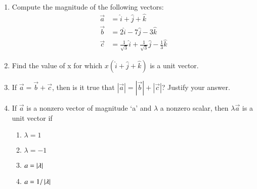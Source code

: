 \begin{enumerate}[label=\thesection.\arabic*,ref=\thesection.\theenumi]
\item Compute the magnitude of the following vectors:
\begin{align}
	\vec{a}&=\hat{i}+\hat{j}+\hat{k}
	\\
	\vec{b}&=2\hat{i}-7\hat{j}-3\hat{k}
	\\
	\vec{c}&=\frac{1}{\sqrt{3}}\hat{i}+\frac{1}{\sqrt{3}}\hat{j}-\frac{1}{3}\hat{k}
\end{align}
    \solution 
		
\item Find the value of x for which $x(\hat{i}+\hat{j}+\hat{k})$ is a unit vector.\\
	\solution
		
\item If $\vec{a}=\vec{b}+\vec{c}$, then is it true that $|\vec{a}|=|\vec{b}|+|\vec{c}|$? Justify your answer.\\
	\solution
		
\item If $\overrightarrow {a}$ is a nonzero vector of magnitude `a' and $\lambda$ a nonzero scalar, then $\lambda\overrightarrow {a}$ is a unit vector if
\begin{enumerate} 
\item $\lambda=1$ 
\item $\lambda=-1$
\item $a=\left\vert\lambda\right\vert$
\item $a=1/\left\vert\lambda\right\vert$  
\end{enumerate}

\end{enumerate}
